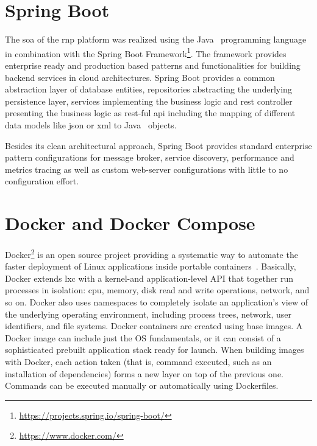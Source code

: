 \documentclass[
a4paper,
twoside,
headsepline,
cleardoublepage=empty,
parskip=half,
draft=false
]{scrbook}
\begin{document}
		\section{Spring Boot}\label{sec:spring_boot}

			The \gls{soa} of the \gls{rnp} platform was realized using the Java~\cite{java2015} programming language in combination with the Spring Boot Framework\footnote{\url{https://projects.spring.io/spring-boot/}}. The framework provides enterprise ready and production based patterns and functionalities for building backend services in cloud architectures. Spring Boot provides a common abstraction layer of database entities, repositories abstracting the underlying persistence layer, services implementing the business logic and \gls{rest} controller presenting the business logic as \gls{rest}-ful \gls{api} including the mapping of different data models like \gls{json} or \gls{xml} to Java~\cite{java2015} objects.
			
			Besides its clean architectural approach, Spring Boot provides standard enterprise pattern configurations for message broker, service discovery, performance and metrics tracing as well as custom web-server configurations with little to no configuration effort.

		\section{Docker and Docker Compose}\label{sec:docker}
		
			Docker\footnote{\url{https://www.docker.com/}} is an open source project providing a systematic way to automate the faster deployment of Linux applications inside portable containers~\cite{bernstein2014containers}. 
			Basically, Docker extends \gls{lxc} with a kernel-and application-level API that together run processes in isolation: \gls{cpu}, memory, disk read and write operations, network, and so on. 
			Docker also uses namespaces to completely isolate an application’s view of the underlying operating environment, including process trees, network, user identifiers, and file systems.
			Docker containers are created using base images.
			A Docker image can include just the OS fundamentals, or it can consist of a sophisticated prebuilt application stack ready for launch. 
			When building images with Docker, each action taken (that is, command executed, such as an installation of dependencies) forms a new layer on top of the previous one. 
			Commands can be executed manually or automatically using Dockerfiles.
			
\end{document}
